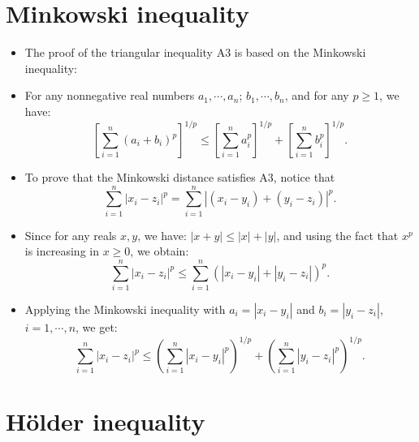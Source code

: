 \documentclass[
]{article}
\begin{document}
\hypertarget{minkowski-inequality}{%
\section{Minkowski inequality}\label{minkowski-inequality}}

\begin{itemize}
\item
  The proof of the triangular inequality A3 is based on the Minkowski
  inequality:
\item
  For any nonnegative real numbers \(a_1,\cdots,a_n\);
  \(b_1,\cdots,b_n\), and for any \(p\geq 1\), we have: \[
  \left[\sum_{i=1}^n (a_i+b_i)^{p}\right]^{1/p}\leq
  \left[\sum_{i=1}^n a_i^{p}\right]^{1/p}
  +\left[\sum_{i=1}^n b_i^{p}\right]^{1/p}.
  \]
\item
  To prove that the Minkowski distance satisfies A3, notice that \[
   \sum_{i=1}^n|x_i-z_i|^{p}= \sum_{i=1}^n|(x_i-y_i)+(y_i-z_i)|^{p}.
  \]
\item
  Since for any reals \(x,y\), we have: \(|x+y|\leq |x|+|y|\), and using
  the fact that \(x^p\) is increasing in \(x\geq 0\), we obtain: \[
   \sum_{i=1}^n|x_i-z_i|^{p}\leq \sum_{i=1}^n(|x_i-y_i|+|y_i-z_i|)^{p}.
  \]
\item
  Applying the Minkowski inequality with \(a_i=|x_i-y_i|\) and
  \(b_i=|y_i-z_i|\), \(i=1,\cdots,n\), we get: \[
   \sum_{i=1}^n|x_i-z_i|^{p}\leq \left(\sum_{i=1}^n |x_i-y_i|^{p}\right)^{1/p}+\left(\sum_{i=1}^n |y_i-z_i|^{p}\right)^{1/p}.
  \]
\end{itemize}

\hypertarget{huxf6lder-inequality}{%
\section{Hölder inequality}\label{huxf6lder-inequality}}
\end{document}
